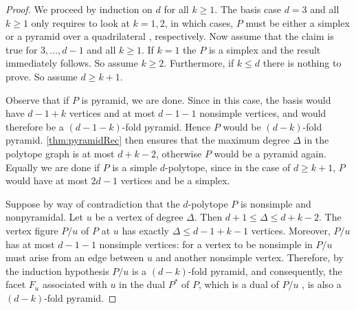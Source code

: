 \documentclass[a4paper]{amsart}
\theoremstyle{definition}
\theoremstyle{remark}
\begin{document}
\begin{proof} 

We proceed by induction on $d$ for all $k\ge 1$.  The basis case $d=3$ and all $k\ge1$ only requires to look at $k=1,2$, in which cases, $P$ must be either a simplex or a pyramid over a quadrilateral \cite[Fig.~2]{BriDun73}, respectively.   Now assume that the claim is true for $3,\ldots,d-1$ and all $ k\ge 1$. If $k=1$ the $P$ is a simplex and the result immediately follows. So assume $k\ge 2$.  Furthermore, if $k\le d$ there is nothing to prove. So assume $d\ge k+1$. 

Observe that if $P$ is pyramid, we are done. Since in this case, the basis would have $d-1+k$ vertices and at most $d-1-1$ nonsimple vertices, and would therefore be a $(d-1-k)$-fold pyramid. Hence $P$ would be $(d-k)$-fold pyramid. \cref{thm:pyramidRec} then ensures that the maximum degree  ${\Delta}$ in the polytope graph is at most $d+k-2$, otherwise $P$ would be a pyramid again. Equally we are done if $P$ is a simple $d$-polytope, since in the case of $d\ge k+1$, $P$ would have at most $2d-1$ vertices and be a simplex.  

  
Suppose by way of contradiction that the $d$-polytope $P$ is nonsimple and nonpyramidal. Let $u$ be a vertex of degree  ${\Delta}$. Then $d+1\le {\Delta}\le d+k-2$.  The vertex figure $P/u$ of $P$   at $u$ has exactly ${\Delta}\le d-1+k-1$ vertices. Moreover,  $P/u$  has at most $d-1-1$ nonsimple vertices: for a vertex to be nonsimple in $P/u$ must arise from an edge between $u$ and another nonsimple vertex. Therefore, by the induction hypothesis $P/u$ is a $(d-k)$-fold pyramid, and consequently, the facet $F_u$ associated with $u$ in the dual $P^*$ of $P$, which is a dual of $P/u$ \cite[Thm.~11.5]{Bro83}, is also a $(d-k)$-fold pyramid. 


\end{proof}
\end{document}
